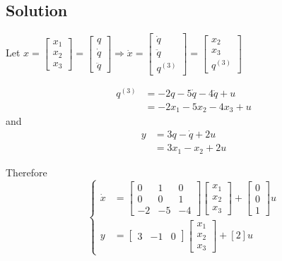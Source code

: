 \documentclass[12pt,a4paper]{article}
\begin{document}
\subsection*{Solution}

Let $ x = \begin{bmatrix}
	x_1 \\ x_2 \\ x_3
\end{bmatrix} = \begin{bmatrix}	
   q \\ \dot q \\ \ddot q
\end{bmatrix}
 \Rightarrow \dot x = \begin{bmatrix}
	\dot q \\ \ddot q \\ q^{(3)}
\end{bmatrix} = \begin{bmatrix}
x_2 \\ x_3 \\ q^{(3)}
\end{bmatrix}
$ 

\begin{align*}
	q^{(3)} &= -2q - 5\dot q - 4\ddot q + u \\
	&= -2 x_1 - 5x_2 - 4x_3 + u
\end{align*}
and
\begin{align*}
	y &= 3q - \dot q + 2u \\
	&= 3x_1 - x_2 + 2u 
\end{align*}

Therefore
\[
\begin{cases}
	\dot x &= \begin{bmatrix}		
		0 & 1 & 0 \\
		0 & 0 & 1 \\
		-2 & -5 & - 4
	\end{bmatrix}	\begin{bmatrix}
	x_1 \\ x_2 \\ x_3
	\end{bmatrix} + \begin{bmatrix}
	0 \\ 0 \\ 1
	\end{bmatrix} u \\
	y &= \begin{bmatrix}
		3 & -1 & 0
	\end{bmatrix} \begin{bmatrix}	
	x_1 \\ x_2 \\ x_3
	\end{bmatrix} + [2]u
\end{cases}
\]
\end{document}
